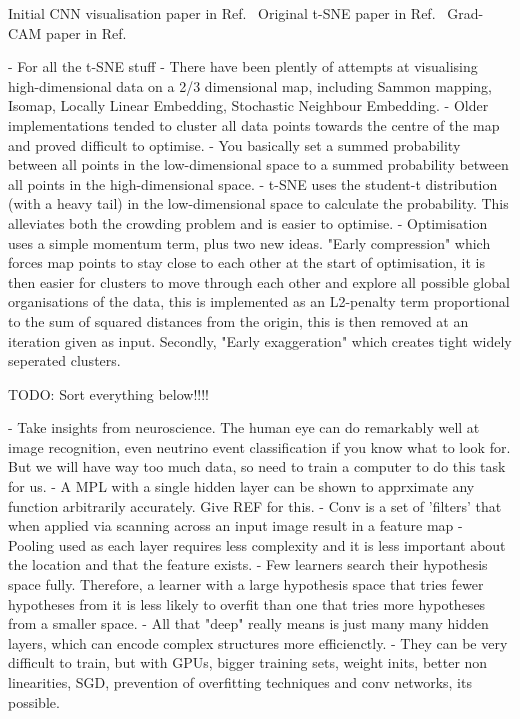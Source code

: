 Initial CNN visualisation paper in Ref.~\cite{zeiler2013}
Original t-SNE paper in Ref.~\cite{maaten2008}
Grad-CAM paper in Ref.~\cite{elvaraju2019}

- For all the t-SNE stuff
- There have been plently of attempts at visualising high-dimensional data on a 2/3 dimensional
map, including Sammon mapping, Isomap, Locally Linear Embedding, Stochastic Neighbour Embedding.
- Older implementations tended to cluster all data points towards the centre of the map and proved
difficult to optimise.
- You basically set a summed probability between all points in the low-dimensional space to a
summed probability between all points in the high-dimensional space.
- t-SNE uses the student-t distribution (with a heavy tail) in the low-dimensional space to
calculate the probability. This alleviates both the crowding problem and is easier to optimise.
- Optimisation uses a simple momentum term, plus two new ideas. "Early compression" which forces
map points to stay close to each other at the start of optimisation, it is then easier for
clusters to move through each other and explore all possible global organisations of the data,
this is implemented as an L2-penalty term proportional to the sum of squared distances from the
origin, this is then removed at an iteration given as input. Secondly, "Early exaggeration" which
creates tight widely seperated clusters.

TODO: Sort everything below!!!!

- Take insights from neuroscience. The human eye can do remarkably well at image recognition, even neutrino event classification if
you know what to look for. But we will have way too much data, so need to train a computer to do this task for us.
- A MPL with a single hidden layer can be shown to apprximate any function arbitrarily accurately. Give REF for this.
- Conv is a set of 'filters' that when applied via scanning across an input image result in a feature map
- Pooling used as each layer requires less complexity and it is less important about the location and that the feature exists.
- Few learners search their hypothesis space fully. Therefore, a learner with a large hypothesis space that tries fewer hypotheses from it is less likely to overfit than one that tries more hypotheses from a smaller space.
- All that "deep" really means is just many many hidden layers, which can encode complex structures more efficienctly.
- They can be very difficult to train, but with GPUs, bigger training sets, weight inits, better non linearities, SGD, prevention of overfitting techniques and conv networks, its possible.

